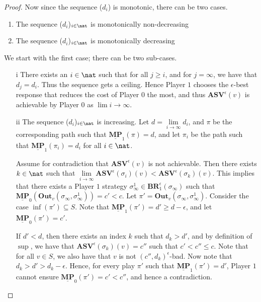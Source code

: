 \begin{proof}
Now since the sequence ($d_i$) is monotonic, there can be two cases.
\begin{enumerate}
    \item The sequence ($d_i$)$_{i \in \nat}$ is monotonically non-decreasing
    \item The sequence ($d_i$)$_{i \in \nat}$ is monotonically decreasing
\end{enumerate}
We start with the first case; there can be two sub-cases.
\begin{enumerate}
\item[i] There exists an $i \in \nat$ such that for all $j \geqslant i$, and for $j=\infty$, we have that $d_j=d_i$.
Thus the sequence gets a ceiling.
Hence Player $1$ chooses the $\epsilon$-best response that reduces the cost of Player $0$ the most, and thus $\mathbf{ASV}^{\epsilon}(v)$ is achievable by Player $0$ as $\lim \limits{i \rightarrow \infty}$.
\item[ii] The sequence ($d_i$)$_{i \in \nat}$ is increasing.
Let $d = \lim \limits_{i \rightarrow \infty} d_i$, and $\pi$ be the corresponding path such that $\underline{\mathbf{MP}}_1(\pi) = d$, and let $\pi_i$ be the path such that $\underline{\mathbf{MP}}_1(\pi_i)=d_i$ for all $i \in \nat$.

Assume for contradiction that $\mathbf{ASV}^{\epsilon}(v)$ is not achievable.
Then there exists $k \in \nat$ such that $\lim \limits_{i \rightarrow \infty} \mathbf{ASV}^{\epsilon}(\sigma_i)(v) < \mathbf{ASV}^{\epsilon}(\sigma_k)(v)$.
This implies that there exists a Player $1$ strategy $\sigma_\infty^1 \in \mathbf{BR}_1^{\epsilon}(\sigma_\infty)$ such that $\underline{\mathbf{MP}}_0(\mathbf{Out}_v(\sigma_\infty,\sigma_\infty^1)) = c' < c$.
Let $\pi'= \mathbf{Out}_v(\sigma_\infty,\sigma_\infty^1)$.
Consider the case $\inf(\pi') \subseteq S$.
Note that $\underline{\mathbf{MP}}_1(\pi') = d'\ge d - \epsilon$, and let $\underline{\mathbf{MP}}_0(\pi')=c'$.

If $d' < d$, then there exists an index $k$ such that $d_k > d'$, and by definition of $\sup$, we have that $\mathbf{ASV}^{\epsilon}(\sigma_k)(v)=c''$ such that $c'< c'' \le c$.
Note that for all $v \in S$, we also have that $v$ is not $(c'', d_k)^\epsilon$-bad.
Now note that $d_k > d' > d_k -\epsilon$.
Hence, for every play $\pi'$ such that $\underline{\mathbf{MP}}_1(\pi')=d'$, Player $1$ cannot ensure $\underline{\mathbf{MP}}_0(\pi')=c' < c''$, and hence a contradiction.


\end{enumerate}
\end{proof}

